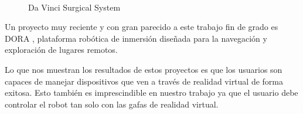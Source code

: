 \documentclass[twoside, 11pt]{epstfg}
\begin{document}
\begin{figure}[H]
	\centering
	\\
	\caption{Da Vinci Surgical System}
	 \label{daVinci}
\end{figure}


Un proyecto muy reciente y con gran parecido a este trabajo fin de grado es DORA \cite{DORA}, plataforma robótica de inmersión diseñada para la navegación y exploración de lugares remotos.

Lo que nos muestran los resultados de estos proyectos es que los usuarios son capaces de manejar dispositivos que ven a través de realidad virtual de forma exitosa. Esto también es imprescindible en nuestro trabajo ya que el usuario debe controlar el robot tan solo con las gafas de realidad virtual.



\end{document}
